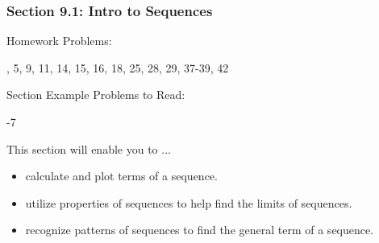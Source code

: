 %
%

\begin{frame}
\frametitle{\Large {\color[rgb]{0.02,0.20,1.0} Section 9.1: Intro to Sequences}}
\scriptsize
\vspace{0.3cm}
\begin{block}{Homework Problems:}

\vspace{0.2cm}
, 5, 9, 11, 14, 15, 16, 18, 25, 28, 29, 37-39, 42
\end{block}
\vspace{0.2cm}

\begin{block}{Section Example Problems to Read:}

\vspace{0.2cm}
-7
	
\end{block}
\vspace{0.2cm}

\begin{block}{This section will enable you to ...}
\begin{itemize}
	\item[...] calculate and plot terms of a sequence.
	\item[...] utilize properties of sequences to help find the limits of sequences. 
	\item[...] recognize patterns of sequences to find the general term of a sequence.
\end{itemize}
\end{block}
\vspace{3.0cm}
\end{frame}

